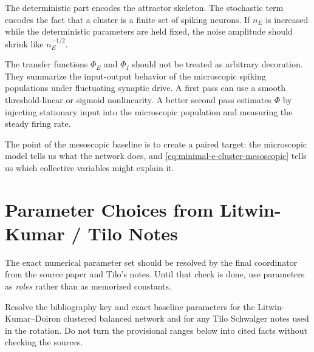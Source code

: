 \noindent The deterministic part encodes the attractor skeleton. The stochastic term encodes the fact that a cluster is a finite set of spiking neurons. If $n_E$ is increased while the deterministic parameters are held fixed, the noise amplitude should shrink like $n_E^{-1/2}$.

The transfer functions $\Phi_E$ and $\Phi_I$ should not be treated as arbitrary decoration. They summarize the input-output behavior of the microscopic spiking populations under fluctuating synaptic drive. A first pass can use a smooth threshold-linear or sigmoid nonlinearity. A better second pass estimates $\Phi$ by injecting stationary input into the microscopic population and measuring the steady firing rate.

The point of the mesoscopic baseline is to create a paired target: the microscopic model tells us what the network does, and \eqref{eq:minimal-e-cluster-mesoscopic} tells us which collective variables might explain it.

\section{Parameter Choices from Litwin-Kumar / Tilo Notes}
\label{sec:parameter-choices-from-lk-tilo-notes}

The exact numerical parameter set should be resolved by the final coordinator from the source paper and Tilo's notes. Until that check is done, use parameters as \emph{roles} rather than as memorized constants.

\begin{aside}
Resolve the bibliography key and exact baseline parameters for the Litwin-Kumar--Doiron clustered balanced network and for any Tilo Schwalger notes used in the rotation. Do not turn the provisional ranges below into cited facts without checking the sources.
\end{aside}

